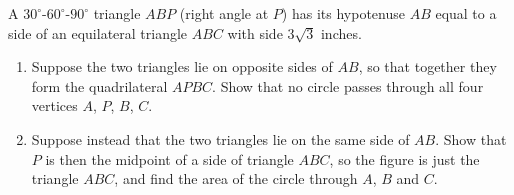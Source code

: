 A $30^\circ$-$60^\circ$-$90^\circ$ triangle $ABP$ (right angle at $P$) has its hypotenuse $AB$ equal to a side of an equilateral triangle $ABC$ with side $3\sqrt3$ inches.
\begin{enumerate}
\item[(a)] Suppose the two triangles lie on opposite sides of $AB$, so that together they form the quadrilateral $APBC$. Show that no circle passes through all four vertices $A$, $P$, $B$, $C$.
\item[(b)] Suppose instead that the two triangles lie on the same side of $AB$. Show that $P$ is then the midpoint of a side of triangle $ABC$, so the figure is just the triangle $ABC$, and find the area of the circle through $A$, $B$ and $C$.
\end{enumerate}

